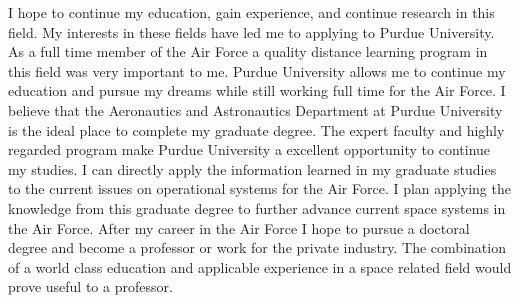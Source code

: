 \documentclass[12pt, oneside]{article}   	%
\begin{document}

I hope to continue my education, gain experience, and continue research in this field.   
My interests in these fields have led me to applying to Purdue University.  
As a full time member of the Air Force a quality distance learning program in this field was very important to me.  
Purdue University allows me to continue my education and pursue my dreams while still working full time for the Air Force.  
I believe that the Aeronautics and Astronautics Department at Purdue University is the ideal place to complete my graduate degree. 
The expert faculty and highly regarded program make Purdue University a excellent opportunity to continue my studies.  
I can directly apply the information learned in my graduate studies to the current issues on operational systems for the Air Force. 
I plan applying the knowledge from this graduate degree to further advance current space systems in the Air Force.  
After my career in the Air Force I hope to pursue a doctoral degree and become a professor or work for the private industry.  
The combination of a world class education and applicable experience in a space related field would prove useful to a professor.      

\end{document}

